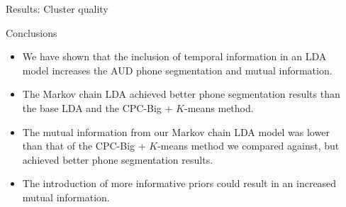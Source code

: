 \documentclass[final]{beamer}
\begin{document}
\begin{frame}[t]
\begin{columns}[T]
\begin{column}{.33\linewidth}
\begin{minipage}[T]{.97\textwidth}
{\begin{block}{Results: Cluster quality}
                 \end{block}

                    \begin{block}{Conclusions}
                        \begin{itemize}
                            \setlength{\itemsep}{0.5ex}
                            \item We have shown that the inclusion of temporal information in an LDA model increases the AUD phone segmentation and mutual information.
                            \item The Markov chain LDA achieved better phone segmentation results than the base LDA and the CPC-Big +  $K$-means method.
                            \item The mutual information from our Markov chain LDA model was lower than that of the CPC-Big + \(K\)-means method we compared against, but achieved better phone segmentation results.
                            \item The introduction of more informative priors could result in an increased mutual information.

                        \end{itemize}

                    \end{block}



                }\end{minipage}
        \end{column}



        \begin{column}{.01\linewidth}\end{column} %

    \end{columns}
\end{frame}
\end{document}
